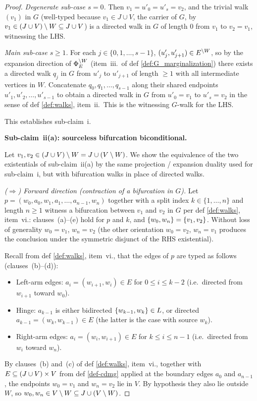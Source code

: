 \documentclass[main]{subfiles}
\begin{document}
\begin{proof}
\emph{Degenerate sub-case $s = 0$.} Then $v_1 = u'_0 = u'_s = v_2$, and the trivial walk $(v_1)$ in $G$ (well-typed because $v_1 \in J \cup V$, the carrier of $G$, by $v_1 \in (J \cup V) \setminus W \subseteq J \cup V$) is a directed walk in $G$ of length $0$ from $v_1$ to $v_2 = v_1$, witnessing the LHS.

\emph{Main sub-case $s \ge 1$.} For each $j \in \{0, 1, \dots, s-1\}$, $(u'_j, u'_{j+1}) \in E^{\setminus W}$, so by the expansion direction of $\Phi_E^{\setminus W}$ (item~iii.\ of def \ref{def:G_marginalization}) there exists a directed walk $q_j$ in $G$ from $u'_j$ to $u'_{j+1}$ of length $\ge 1$ with all intermediate vertices in $W$. Concatenate $q_0, q_1, \dots, q_{s-1}$ along their shared endpoints $u'_1, u'_2, \dots, u'_{s-1}$ to obtain a directed walk in $G$ from $u'_0 = v_1$ to $u'_s = v_2$ in the sense of def \ref{def:walks}, item~ii.\ This is the witnessing $G$-walk for the LHS.

This establishes sub-claim~i.

\medskip\noindent\textbf{Sub-claim~ii(a): sourceless bifurcation biconditional.}

Let $v_1, v_2 \in (J \cup V) \setminus W = J \cup (V \setminus W)$. We show the equivalence of the two existentials of sub-claim~ii(a) by the same projection / expansion duality used for sub-claim~i, but with bifurcation walks in place of directed walks.

\smallskip\noindent\emph{($\Rightarrow$) Forward direction (contraction of a bifurcation in $G$).}
Let $p = (w_0, a_0, w_1, a_1, \dots, a_{n-1}, w_n)$ together with a split index $k \in \{1, \dots, n\}$ and length $n \ge 1$ witness a bifurcation between $v_1$ and $v_2$ in $G$ per def \ref{def:walks}, item~vi.: clauses~(a)--(e) hold for $p$ and $k$, and $\left \{ w_0, w_n \right \} = \left \{ v_1, v_2 \right \}$. Without loss of generality $w_0 = v_1$, $w_n = v_2$ (the other orientation $w_0 = v_2$, $w_n = v_1$ produces the conclusion under the symmetric disjunct of the RHS existential).

Recall from def \ref{def:walks}, item~vi., that the edges of $p$ are typed as follows (clauses~(b)--(d)):
\begin{itemize}
    \item Left-arm edges: $a_i = (w_{i+1}, w_i) \in E$ for $0 \le i \le k-2$ (i.e.\ directed from $w_{i+1}$ toward $w_0$).
    \item Hinge: $a_{k-1}$ is either bidirected $\left \{ w_{k-1}, w_k \right \} \in L$, or directed $a_{k-1} = (w_k, w_{k-1}) \in E$ (the latter is the case with source $w_k$).
    \item Right-arm edges: $a_i = (w_i, w_{i+1}) \in E$ for $k \le i \le n-1$ (i.e.\ directed from $w_i$ toward $w_n$).
\end{itemize}
By clauses~(b) and~(c) of def \ref{def:walks}, item~vi., together with $E \subseteq (J \cup V) \times V$ from def \ref{def-cdmg} applied at the boundary edges $a_0$ and $a_{n-1}$, the endpoints $w_0 = v_1$ and $w_n = v_2$ lie in $V$. By hypothesis they also lie outside $W$, so $w_0, w_n \in V \setminus W \subseteq J \cup (V \setminus W)$.


\end{proof}
\end{document}
